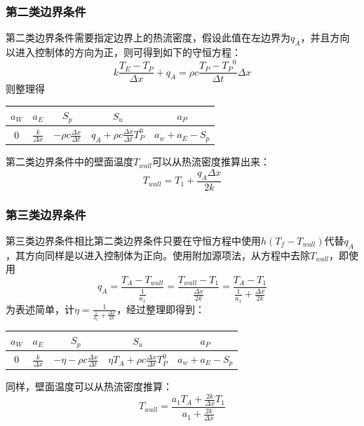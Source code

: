\documentclass[10pt]{scrartcl}
\begin{document}
\subsubsection{第二类边界条件}
第二类边界条件需要指定边界上的热流密度，假设此值在左边界为$q_A$，并且方向以进入控制体的方向为正，则可得到如下的守恒方程：
\begin{equation}
	k\frac{T_E-T_P}{\Delta x} +q_A = \rho c \frac{T_P-{T_P}^0}{\Delta t}\Delta x
\end{equation}
则整理得
\begin{center}
	\begin{tabular}{|c|c|c|c|c|}
		\hline 
		$a_W$&  $a_E$&$S_p$& $S_u$ & $a_P$ \\ 
		\hline 
		0& $\frac{k}{\Delta x}$ &$-\rho c \frac{\Delta x}{\Delta t}$&$ q_A+\rho c \frac{\Delta x}{\Delta t}T_P^0$ &$a_w+a_E-S_p$  \\ 
		\hline 
	\end{tabular} 
\end{center}
第二类边界条件中的壁面温度$T_{wall}$可以从热流密度推算出来：
\begin{equation}
	T_{wall} = T_1+\frac{q_A \Delta x}{2k}
\end{equation}

\subsubsection{第三类边界条件}
第三类边界条件相比第二类边界条件只要在守恒方程中使用$h(T_{f}-T_{wall})$代替$q_A$，其方向同样是以进入控制体为正向。使用附加源项法，从方程中去除$T_{wall}$，即使用
\begin{equation}
	q_A = \frac{T_A-T_{wall}}{\frac{1}{a_1}}=\frac{T_{wall}-T_1}{\frac{\Delta x}{2k}}=\frac{T_A-T_1}{\frac{1}{a_1}+\frac{\Delta x}{2k}}
\end{equation}
为表述简单，计$\eta = \frac{1}{\frac{1}{a_1}+\frac{\Delta x}{2k}}$，经过整理即得到：
\begin{center}
	\begin{tabular}{|c|c|c|c|c|}
		\hline 
		$a_W$&  $a_E$&$S_p$& $S_u$ & $a_P$ \\ 
		\hline 
		0& $\frac{k}{\Delta x}$ &$-\eta-\rho c \frac{\Delta x}{\Delta t}$&$ \eta T_A+\rho c \frac{\Delta x}{\Delta t}T_P^0$ &$a_w+a_E-S_p$  \\ 
		\hline 
	\end{tabular} 
\end{center}
同样，壁面温度可以从热流密度推算：
\begin{equation}
	T_{wall}=\frac{a_1T_A+\frac{2k}{\Delta x}T_1}{a_1+\frac{2k}{\Delta x}}
\end{equation}
\end{document}
